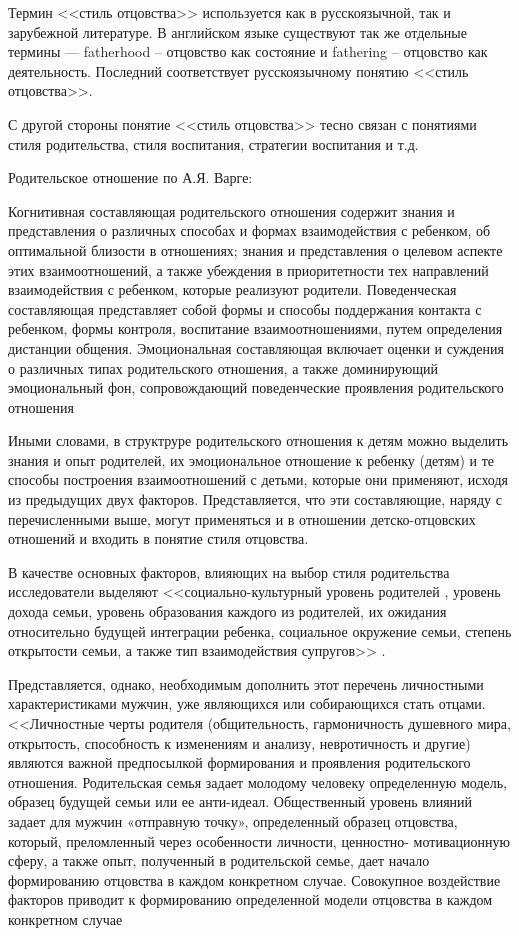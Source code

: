 \documentclass{../../common/thesisbyxetex}
\begin{document}
Термин <<стиль отцовства>> используется как в русскоязычной, так и зарубежной литературе. В 
английском языке существуют так же отдельные термины --- fatherhood -- отцовство как 
состояние и fathering -- отцовство как деятельность. Последний соответствует русскоязычному понятию 
<<стиль отцовства>>.

С другой стороны понятие <<стиль отцовства>> тесно связан с понятиями стиля родительства, стиля 
воспитания, стратегии воспитания и т.д. 

Родительское отношение по А.Я. Варге:

Когнитивная составляющая родительского отношения содержит знания и
представления о различных способах и формах взаимодействия с ребенком, об
оптимальной близости в отношениях; знания и представления о целевом аспекте этих
взаимоотношений, а также убеждения в приоритетности тех направлений
взаимодействия с ребенком, которые реализуют родители.
Поведенческая составляющая представляет собой формы и способы поддержания
контакта с ребенком, формы контроля, воспитание взаимоотношениями, путем
определения дистанции общения.
Эмоциональная составляющая включает оценки и суждения о различных типах
родительского отношения, а также доминирующий эмоциональный фон,
сопровождающий поведенческие проявления родительского отношения \cite{varga}

Иными словами, в структруре родительского отношения к детям можно выделить знания и опыт родителей, 
их эмоциональное отношение к ребенку (детям) и те способы построения взаимоотношений с детьми, 
которые они применяют, исходя из предыдущих двух факторов. Представляется, что эти составляющие, 
наряду с перечисленными выше, могут применяться и в отношении детско-отцовских отношений и входить 
в понятие стиля отцовства.

В качестве основных факторов, влияющих на выбор стиля родительства исследователи выделяют  
<<социально-культурный уровень
родителей , уровень дохода семьи, уровень
образования каждого из родителей, их ожидания относительно будущей интеграции
ребенка, социальное окружение семьи, степень открытости семьи, а также тип
взаимодействия супругов>> \cite[286]{strat}.

Представляется, однако, необходимым дополнить этот перечень личностными характеристиками мужчин, 
уже являющихся или собирающихся стать отцами. <<Личностные черты родителя
(общительность, гармоничность душевного мира, открытость, способность к
изменениям и анализу, невротичность и другие) являются важной предпосылкой
формирования и проявления родительского отношения. Родительская семья задает
молодому человеку определенную модель, образец будущей семьи или ее анти-идеал.
Общественный уровень влияний задает для мужчин «отправную точку», определенный
образец отцовства, который, преломленный через особенности личности, ценностно-
мотивационную сферу, а также опыт, полученный в родительской семье, дает начало
формированию отцовства в каждом конкретном случае. Совокупное воздействие
факторов приводит к формированию определенной модели отцовства в каждом
конкретном случае \cite[122]{har}
\end{document}
